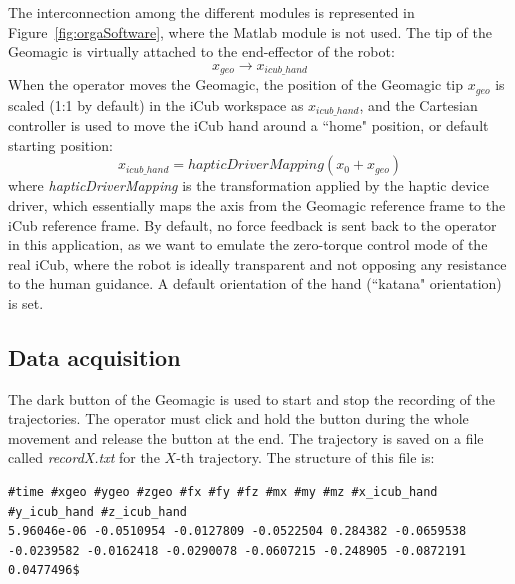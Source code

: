 \documentclass[utf8]{frontiersSCNS} %
\begin{document}
The interconnection among the different modules is represented in Figure~\ref{fig:orgaSoftware}, where the Matlab module is not used. %
The tip of the Geomagic is virtually attached to the end-effector of the robot:
$$ x_{geo} \rightarrow x_{icub\_hand} $$
When the operator moves the Geomagic, the position of the Geomagic tip $x_{geo}$ is scaled (1:1 by default) in the iCub workspace as $x_{icub\_hand}$, and the Cartesian controller is used to move the iCub hand around a ``home" position, or default starting position:
$$ x_{icub\_hand} = hapticDriverMapping(x_0 + x_{geo})$$
where \textit{hapticDriverMapping} is the transformation applied by the haptic device driver, which essentially maps the axis from the Geomagic reference frame to the iCub reference frame.
By default, no force feedback is sent back to the operator in this application, as we want to emulate the zero-torque control mode of the real iCub, where the robot is ideally transparent and not opposing any resistance to the human guidance. A default orientation of the hand (``katana" orientation) is set.


\subsection{Data acquisition}
\label{sec:dataAquisition}
The dark button of the Geomagic is used to start and stop the recording of the trajectories. The operator must click and hold the button during the whole movement and release the button at the end. The trajectory is saved on a file called \textit{recordX.txt} for the $X$-th trajectory. The structure of this file is:
\begin{lstlisting}
#time #xgeo #ygeo #zgeo #fx #fy #fz #mx #my #mz #x_icub_hand #y_icub_hand #z_icub_hand
5.96046e-06 -0.0510954 -0.0127809 -0.0522504 0.284382 -0.0659538 -0.0239582 -0.0162418 -0.0290078 -0.0607215 -0.248905 -0.0872191 0.0477496$
 \end{lstlisting}

\end{document}
